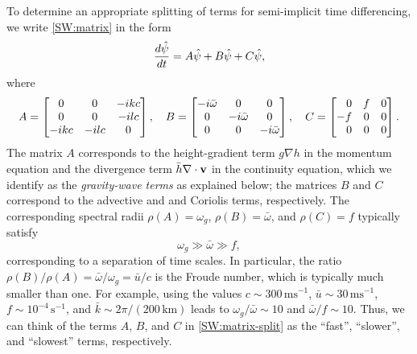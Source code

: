\documentclass[12pt]{article}
\newcommand{\ubar}{\bar{u}}
\newcommand{\href}{\bar{h}}
\newcommand{\kbar}{\bar{k}}
\newcommand{\omegabar}{\bar{\omega}}
\newcommand{\del}{\nabla}
\newcommand{\units}[1]{\,\mbox{#1}}
\begin{document}
To determine an appropriate splitting of terms for semi-implicit time
differencing, we write \eqref{SW:matrix} in the form
\begin{equation}
  \dfrac{d\hat{\psi}}{dt} = A\hat{\psi} + B\hat{\psi} + C\hat{\psi},
\label{SW:matrix-split}
\end{equation}
where
\begin{equation}
  A = \begin{bmatrix}
       0 & 0 & -ikc \\
      0 & 0 & -ilc \\
      -ikc & -ilc & 0 \\
      \end{bmatrix},
\quad
  B = \begin{bmatrix}
       -i\omegabar & 0 & 0 \\
      0 & -i\omegabar & 0 \\
      0 & 0 & -i\omegabar \\
      \end{bmatrix},
\quad
  C = \begin{bmatrix}
       \hfill 0 & f & 0 \\
      -f & 0 & 0 \\
      \hfill 0 & 0 & 0 \\
      \end{bmatrix} .
\end{equation}
The matrix $A$ corresponds to the height-gradient term $g\del h$ in the
momentum equation and the divergence term $\href\del\cdot\vecv$ in the
continuity equation, which we identify as the \emph{gravity-wave terms} as
explained below; the matrices $B$ and $C$ correspond to the advective and and
Coriolis terms, respectively.  The corresponding spectral radii
$\rho(A)=\omega_g$, $\rho(B)=\omegabar$, and $\rho(C)=f$ typically satisfy
\begin{equation}
\omega_g\gg\omegabar\gg f ,
\end{equation}
corresponding to a separation of time scales.  In particular, the ratio
$\rho(B)/\rho(A) = \omegabar/\omega_g = \ubar/c$ is the Froude number, which
is typically much smaller than one.  For example, using the values 
$c\sim 300\units{ms$^{-1}$}$,
$\ubar\sim 30\units{ms$^{-1}$}$,
$f\sim 10^{-4}\units{s$^{-1}$}$, and
$\kbar\sim 2\pi/(200\units{km})$
leads to $\omega_g/\omegabar \sim 10$ and $\omegabar/f\sim 10$. 
Thus, we can think of the terms $A$, $B$, and $C$ in \eqref{SW:matrix-split}
as the ``fast'', ``slower'', and ``slowest'' terms, respectively.
\end{document}
